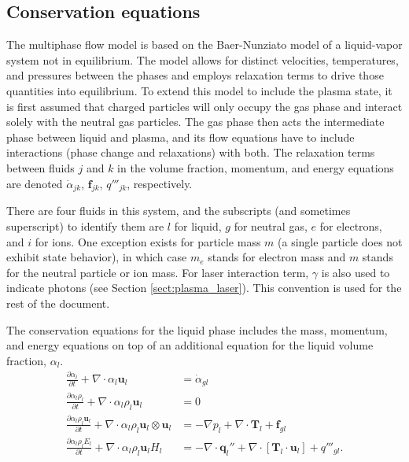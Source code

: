 \subsection{Conservation equations}
The multiphase flow model is based on the Baer-Nunziato model of a liquid-vapor system not in equilibrium. The model allows for distinct velocities, temperatures, and pressures between the phases and
employs relaxation terms to drive those quantities into equilibrium. To extend this model to include the plasma state, it is first assumed that charged particles will only occupy the gas phase and interact solely
with the neutral gas particles. The gas phase then acts the intermediate phase between liquid and plasma, and its flow equations have to include interactions (phase change and relaxations) with both. The relaxation
terms between fluids $j$ and $k$ in the volume fraction, momentum, and energy equations are denoted $\dot{\alpha}_{jk}$, $\mathbf{f}_{jk}$, $q'''_{jk}$, respectively.

There are four fluids in this system, and the subscripts (and sometimes superscript) to identify them are $l$ for liquid, $g$ for neutral gas, $e$ for electrons, and $i$ for ions. One exception exists for particle mass
$m$ (a single particle does not exhibit state behavior), in which case $m_e$ stands for electron mass and $m$ stands for the neutral particle or ion mass. For laser interaction term, $\gamma$ is also used to indicate
photons (see Section \ref{sect:plasma_laser}). This convention is used for the rest of the document.

The conservation equations for the liquid phase includes the mass, momentum, and energy equations on top of an additional equation for the liquid volume fraction, $\alpha_l$.
\begin{subequations}
    \begin{align}
        \frac{\partial \alpha_l}{\partial t} + \nabla \cdot \alpha_l \mathbf{u}_l &= \dot{\alpha}_{gl} \\
        \frac{\partial \alpha_l\rho_l}{\partial t} + \nabla \cdot \alpha_l\rho_l \mathbf{u}_l &= 0 \\
        \frac{\partial \alpha_l\rho_l\mathbf{u}_l}{\partial t} + \nabla \cdot \alpha_l\rho_l \mathbf{u}_l \otimes \mathbf{u}_l &= -\nabla p_l + \nabla \cdot \mathbf{T}_l + \mathbf{f}_{gl} \\
        \frac{\partial \alpha_l\rho_l E_l}{\partial t} + \nabla \cdot \alpha_l\rho_l\mathbf{u}_l H_l &= -\nabla \cdot \mathbf{q}_l'' + \nabla \cdot \left[\mathbf{T}_l \cdot \mathbf{u}_l \right] + q'''_{gl}.
    \end{align}
\end{subequations}

